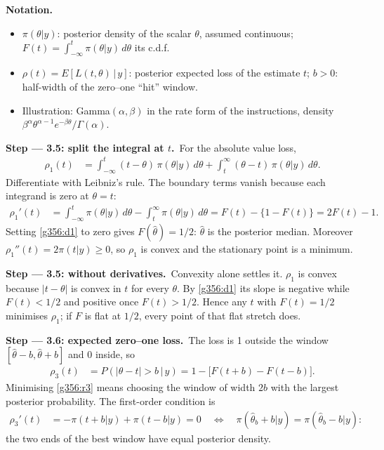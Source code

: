 \documentclass[11pt,a4paper]{article}
\newenvironment{notacao}{\par\smallskip\noindent\textbf{Notation.}\begin{itemize}[leftmargin=1.4em,topsep=1pt,itemsep=0pt]\small}{\end{itemize}}
\newcommand{\passo}[2]{\par\smallskip\noindent\textbf{Step --- #1.}~#2}
\begin{document}
\begin{sol}
\begin{notacao}
\item $\pi(\theta|y)$: posterior density of the scalar $\theta$, assumed continuous; $F(t)=\int_{-\infty}^t\pi(\theta|y)\,d\theta$ its c.d.f.
\item $\rho(t)=E[L(t,\theta)\,|\,y]$: posterior expected loss of the estimate $t$; $b>0$: half-width of the zero--one ``hit'' window.
\item Illustration: Gamma$(\alpha,\beta)$ in the rate form of the instructions, density $\beta^\alpha\theta^{\alpha-1}e^{-\beta\theta}/\Gamma(\alpha)$.
\end{notacao}
\passo{3.5: split the integral at $t$}{For the absolute value loss,
\begin{align}
\rho_1(t)&=\int_{-\infty}^{t}(t-\theta)\,\pi(\theta|y)\,d\theta+\int_{t}^{\infty}(\theta-t)\,\pi(\theta|y)\,d\theta.\label{g356:r1}
\end{align}
Differentiate with Leibniz's rule. The boundary terms vanish because each integrand is zero at $\theta=t$:
\begin{align}
\rho_1'(t)&=\int_{-\infty}^{t}\pi(\theta|y)\,d\theta-\int_{t}^{\infty}\pi(\theta|y)\,d\theta=F(t)-\{1-F(t)\}=2F(t)-1.\label{g356:d1}
\end{align}
Setting \eqref{g356:d1} to zero gives $F(\hat\theta)=1/2$: $\hat\theta$ is the posterior median. Moreover $\rho_1''(t)=2\pi(t|y)\ge0$, so $\rho_1$ is convex and the stationary point is a minimum.}
\passo{3.5: without derivatives}{Convexity alone settles it. $\rho_1$ is convex because $|t-\theta|$ is convex in $t$ for every $\theta$. By \eqref{g356:d1} its slope is negative while $F(t)<1/2$ and positive once $F(t)>1/2$. Hence any $t$ with $F(t)=1/2$ minimises $\rho_1$; if $F$ is flat at $1/2$, every point of that flat stretch does.}
\passo{3.6: expected zero--one loss}{The loss is 1 outside the window $[\hat\theta-b,\hat\theta+b]$ and 0 inside, so
\begin{align}
\rho_3(t)&=P(|\theta-t|>b\,|\,y)=1-\big[F(t+b)-F(t-b)\big].\label{g356:r3}
\end{align}
Minimising \eqref{g356:r3} means choosing the window of width $2b$ with the largest posterior probability. The first-order condition is
\begin{align}
\rho_3'(t)&=-\pi(t+b|y)+\pi(t-b|y)=0\quad\Longleftrightarrow\quad\pi(\hat\theta_b+b|y)=\pi(\hat\theta_b-b|y):\label{g356:foc}
\end{align}
the two ends of the best window have equal posterior density.}

\end{sol}
\end{document}
